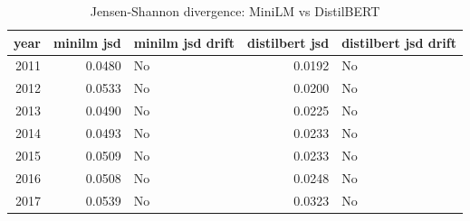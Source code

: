 \begin{table}[ht]
\centering
\caption{Jensen-Shannon divergence: MiniLM vs DistilBERT}
\label{tab:minilm_vs_distilbert_jsd}
\begin{tabular}{rrlrl}
\toprule
year & minilm jsd & minilm jsd drift & distilbert jsd & distilbert jsd drift \\
\midrule
2011 & 0.0480 & No & 0.0192 & No \\
2012 & 0.0533 & No & 0.0200 & No \\
2013 & 0.0490 & No & 0.0225 & No \\
2014 & 0.0493 & No & 0.0233 & No \\
2015 & 0.0509 & No & 0.0233 & No \\
2016 & 0.0508 & No & 0.0248 & No \\
2017 & 0.0539 & No & 0.0323 & No \\
\bottomrule
\end{tabular}
\end{table}
